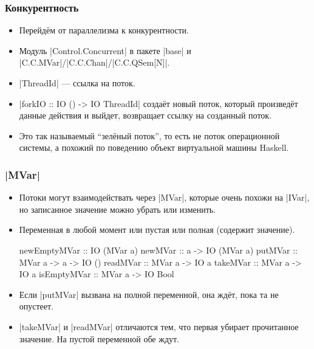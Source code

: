 \documentclass[11pt]{beamer}
\begin{document}
\begin{frame}[fragile]
  \frametitle{Конкурентность}
  \begin{itemize}
    \item Перейдём от параллелизма к конкурентности.
    \item Модуль \haskinline|Control.Concurrent| в пакете \haskinline|base| и \haskinline|C.C.MVar|/\haskinline|C.C.Chan|/\haskinline|C.C.QSem[N]|.
    \item \haskinline|ThreadId| --- ссылка на поток.
    \item \haskinline|forkIO :: IO () -> IO ThreadId| создаёт новый поток, который произведёт данные действия и выйдет, возвращает ссылку на созданный поток.
          \pause
    \item Это так называемый \enquote{зелёный поток}, то есть не поток операционной системы, а похожий по поведению объект виртуальной машины Haskell.
  \end{itemize}
\end{frame}

\begin{frame}[fragile]
  \frametitle{\haskinline|MVar|}
  \begin{itemize}
    \item Потоки могут взаимодействать через \haskinline|MVar|, которые очень похожи на \haskinline|IVar|, но записанное значение можно убрать или изменить.
    \item Переменная в любой момент или пустая или полная (содержит значение).
          \begin{haskellsmall}
            newEmptyMVar :: IO (MVar a)
            newMVar :: a -> IO (MVar a)
            putMVar :: MVar a -> a -> IO ()
            readMVar :: MVar a -> IO a
            takeMVar :: MVar a -> IO a
            isEmptyMVar :: MVar a -> IO Bool
          \end{haskellsmall}
    \item Если \haskinline|putMVar| вызвана на полной переменной, она ждёт, пока та не опустеет.
    \item \haskinline|takeMVar| и \haskinline|readMVar| отличаются тем, что первая убирает прочитанное значение. На пустой переменной обе ждут.
  \end{itemize}
\end{frame}
\end{document}

